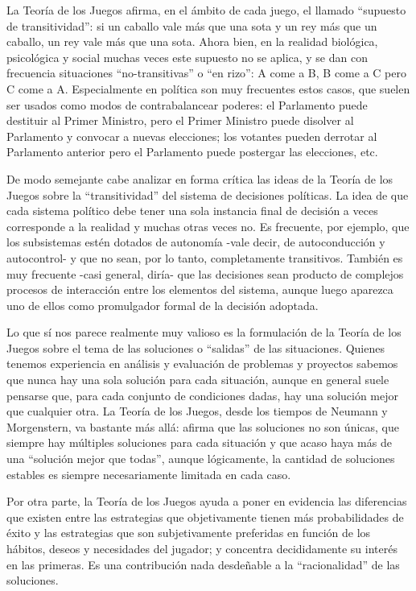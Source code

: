 \documentclass[
]{book}
\begin{document}
La Teoría de los Juegos afirma, en el ámbito de cada juego, el llamado ``supuesto de transitividad'': si un caballo vale más que una sota y un rey más que un caballo, un rey vale más que una sota. Ahora bien, en la realidad biológica, psicológica y social muchas veces este supuesto no se aplica, y se dan con frecuencia situaciones ``no-transitivas'' o ``en rizo'': A come a B, B come a C pero C come a A. Especialmente en política son muy frecuentes estos casos, que suelen ser usados como modos de contrabalancear poderes: el Parlamento puede destituir al Primer Ministro, pero el Primer Ministro puede disolver al Parlamento y convocar a nuevas elecciones; los votantes pueden derrotar al Parlamento anterior pero el Parlamento puede postergar las elecciones, etc.

De modo semejante cabe analizar en forma crítica las ideas de la Teoría de los Juegos sobre la ``transitividad'' del sistema de decisiones políticas. La idea de que cada sistema político debe tener una sola instancia final de decisión a veces corresponde a la realidad y muchas otras veces no. Es frecuente, por ejemplo, que los subsistemas estén dotados de autonomía -vale decir, de autoconducción y autocontrol- y que no sean, por lo tanto, completamente transitivos. También es muy frecuente -casi general, diría- que las decisiones sean producto de complejos procesos de interacción entre los elementos del sistema, aunque luego aparezca uno de ellos como promulgador formal de la decisión adoptada.

Lo que sí nos parece realmente muy valioso es la formulación de la Teoría de los Juegos sobre el tema de las soluciones o ``salidas'' de las situaciones. Quienes tenemos experiencia en análisis y evaluación de problemas y proyectos sabemos que nunca hay una sola solución para cada situación, aunque en general suele pensarse que, para cada conjunto de condiciones dadas, hay una solución mejor que cualquier otra. La Teoría de los Juegos, desde los tiempos de Neumann y Morgenstern, va bastante más allá: afirma que las soluciones no son únicas, que siempre hay múltiples soluciones para cada situación y que acaso haya más de una ``solución mejor que todas'', aunque lógicamente, la cantidad de soluciones estables es siempre necesariamente limitada en cada caso.

Por otra parte, la Teoría de los Juegos ayuda a poner en evidencia las diferencias que existen entre las estrategias que objetivamente tienen más probabilidades de éxito y las estrategias que son subjetivamente preferidas en función de los hábitos, deseos y necesidades del jugador; y concentra decididamente su interés en las primeras. Es una contribución nada desdeñable a la ``racionalidad'' de las soluciones.
\end{document}
